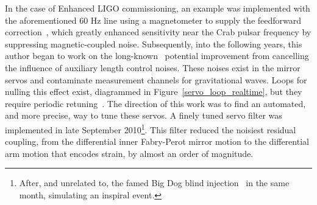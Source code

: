 In the case of Enhanced LIGO commissioning, an example was implemented with the aforementioned 60 Hz line using a magnetometer to supply the feedforward correction~\cite{SmithThesis}, which greatly enhanced sensitivity near the Crab pulsar frequency by suppressing magnetic-coupled noise.
Subsequently, into the following years, this author began to work on the long-known~\cite{AdhikariThesis,BallmerThesis} potential improvement from cancelling the influence of auxiliary length control noises.
These noises exist in the mirror servos and contaminate measurement channels for gravitational waves.
Loops for nulling this effect exist, diagrammed in Figure~\ref{servo_loop_realtime}, but they require periodic retuning~\cite{KissellPRCMICH}.  
The direction of this work was to find an automated, and more precise, way to tune these servos.
A finely tuned servo filter was implemented in late September 2010\footnote{After, and unrelated to, the famed Big Dog blind injection~\cite{Riles2013} in the same month, simulating an inspiral event.}.
This filter reduced the noisiest residual coupling, from the differential inner Fabry-Perot mirror motion to the differential arm motion that encodes strain, by almost an order of magnitude. 


